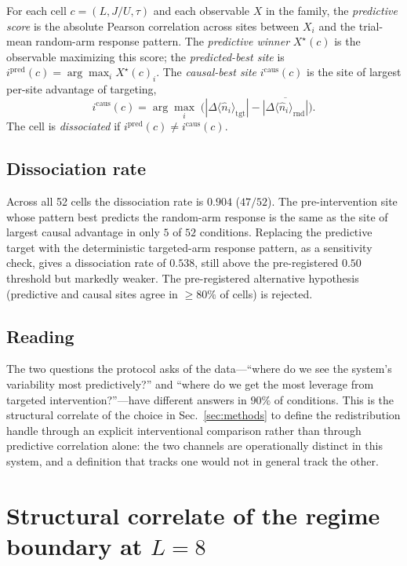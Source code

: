 \documentclass[aps,prresearch,reprint,amsmath,amssymb,longbibliography,floatfix]{revtex4-2}
\newcommand{\nop}{\hat{n}}
\begin{document}
For each cell $c=(L,J/U,\tau)$ and each observable $X$ in the family,
the \emph{predictive score} is the absolute Pearson correlation across
sites between $X_i$ and the trial-mean random-arm response pattern.
The \emph{predictive winner} $X^{\star}(c)$ is the observable maximizing
this score; the \emph{predicted-best site} is
$i^{\mathrm{pred}}(c) = \arg\max_i X^{\star}(c)_i$.
The \emph{causal-best site} $i^{\mathrm{caus}}(c)$ is the site of
largest per-site advantage of targeting,
\begin{equation}
i^{\mathrm{caus}}(c) = \arg\max_i\;\bigl(
  |\Delta\langle\nop_i\rangle_{\mathrm{tgt}}|
  - \overline{|\Delta\langle\nop_i\rangle_{\mathrm{rnd}}|}\bigr).
\end{equation}
The cell is \emph{dissociated} if $i^{\mathrm{pred}}(c)\neq
i^{\mathrm{caus}}(c)$.

\subsection{Dissociation rate}

Across all 52 cells the dissociation rate is $0.904$ ($47/52$).
The pre-intervention site whose pattern best predicts the random-arm
response is the same as the site of largest causal advantage in only $5$
of $52$ conditions.
Replacing the predictive target with the deterministic targeted-arm
response pattern, as a sensitivity check, gives a dissociation rate of
$0.538$, still above the pre-registered $0.50$ threshold but markedly
weaker.
The pre-registered alternative hypothesis (predictive and causal sites
agree in $\geq 80\%$ of cells) is rejected.

\subsection{Reading}

The two questions the protocol asks of the data---``where do we see the
system's variability most predictively?'' and ``where do we get the
most leverage from targeted intervention?''---have different answers
in $90\%$ of conditions.
This is the structural correlate of the choice in
Sec.~\ref{sec:methods} to define the redistribution handle through an
explicit interventional comparison rather than through predictive
correlation alone: the two channels are operationally distinct in this
system, and a definition that tracks one would not in general track the
other.

\section{Structural correlate of the regime boundary at $L=8$}
\label{sec:t3}
\end{document}
